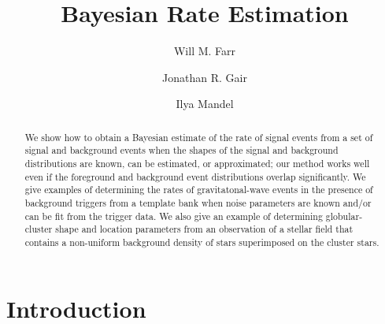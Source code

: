 \documentclass[aps,prd]{revtex4-1}
\begin{document}
\title{Bayesian Rate Estimation}

\author{Will M. Farr} 

\author{Jonathan R. Gair} 

\author{Ilya Mandel} 
 


\begin{abstract}
  We show how to obtain a Bayesian estimate of the rate of signal
  events from a set of signal and background events when the shapes of
  the signal and background distributions are known, can be estimated,
  or approximated; our method works well even if the foreground and
  background event distributions overlap significantly.  We give
  examples of determining the rates of gravitatonal-wave events in the
  presence of background triggers from a template bank when noise
  parameters are known and/or can be fit from the trigger data.  We
  also give an example of determining globular-cluster shape and
  location parameters from an observation of a stellar field that
  contains a non-uniform background density of stars superimposed on
  the cluster stars.
\end{abstract}

\maketitle

\section{Introduction}
\end{document}
